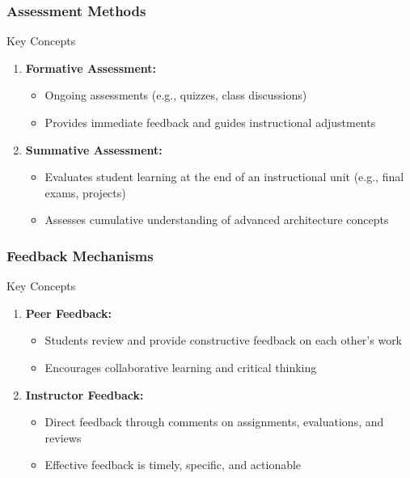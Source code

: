 \documentclass[aspectratio=169]{beamer}
\begin{document}
\begin{frame}[fragile]
    \frametitle{Assessment Methods}
    \begin{block}{Key Concepts}
        \begin{enumerate}
            \item \textbf{Formative Assessment:}
                \begin{itemize}
                    \item Ongoing assessments (e.g., quizzes, class discussions)
                    \item Provides immediate feedback and guides instructional adjustments
                \end{itemize}
            \item \textbf{Summative Assessment:}
                \begin{itemize}
                    \item Evaluates student learning at the end of an instructional unit (e.g., final exams, projects)
                    \item Assesses cumulative understanding of advanced architecture concepts
                \end{itemize}
        \end{enumerate}
    \end{block}
\end{frame}

\begin{frame}[fragile]
    \frametitle{Feedback Mechanisms}
    \begin{block}{Key Concepts}
        \begin{enumerate}
            \item \textbf{Peer Feedback:}
                \begin{itemize}
                    \item Students review and provide constructive feedback on each other's work
                    \item Encourages collaborative learning and critical thinking
                \end{itemize}
            \item \textbf{Instructor Feedback:}
                \begin{itemize}
                    \item Direct feedback through comments on assignments, evaluations, and reviews
                    \item Effective feedback is timely, specific, and actionable
                \end{itemize}
        \end{enumerate}
    \end{block}
\end{frame}
\end{document}
